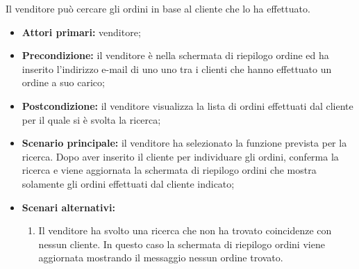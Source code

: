 \label{ricerca-cliente-ordine-venditore}

Il venditore può cercare gli ordini in base al cliente che lo ha effettuato.
\begin{itemize}
	\item \textbf{Attori primari:} venditore;
	\item \textbf{Precondizione:} il venditore è nella schermata di riepilogo ordine ed ha inserito l'indirizzo e-mail di uno uno tra i clienti che hanno effettuato un ordine a suo carico;
	\item \textbf{Postcondizione:} il venditore visualizza la lista di ordini effettuati dal cliente per il quale si è svolta la ricerca;
	\item \textbf{Scenario principale:} il venditore ha selezionato la funzione prevista per la ricerca. Dopo aver inserito il cliente per individuare gli ordini, conferma la ricerca e viene aggiornata la schermata di riepilogo ordini che mostra solamente gli ordini effettuati dal cliente indicato;
	\item \textbf{Scenari alternativi:}
	\begin{enumerate}[label=\lett]
		\item Il venditore ha svolto una ricerca che non ha trovato coincidenze con nessun cliente. In questo caso la schermata di riepilogo ordini viene aggiornata mostrando il messaggio nessun ordine trovato.
	\end{enumerate}
\end{itemize}

\label{filtro-ordini-venditore}

